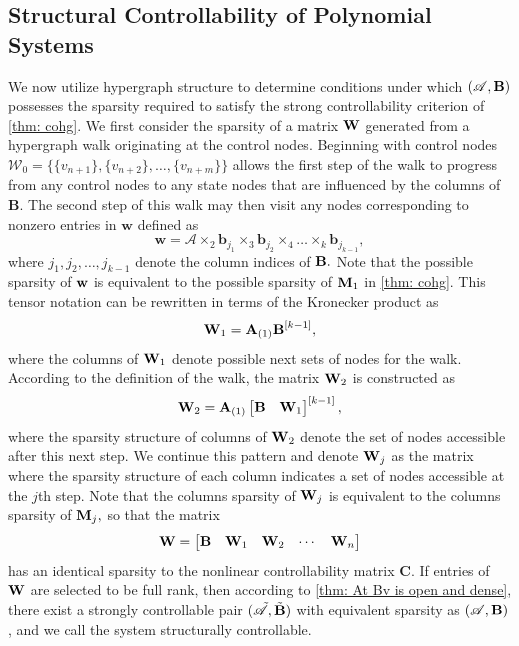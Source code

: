 \documentclass[journal,twoside,web]{ieeecolor}
\newcommand{\Ws}{\mathcal{W}}
\begin{document}
\subsection{Structural Controllability of Polynomial Systems}\label{sec: 3c}
We now utilize hypergraph structure to determine conditions under which $(\mathscr A,\textbf B)$  possesses the sparsity required to satisfy the strong controllability criterion of \cref{thm: cohg}.
%
We first consider the sparsity of a matrix $\textbf W$ generated from a hypergraph walk originating at the control nodes.
%
Beginning with control nodes $\Ws_0=\{\{v_{n+1}\},\{v_{n+2}\},\dots,\{v_{n+m}\}\}$ allows the first step of the walk to progress from any control nodes to any state nodes that are influenced by the columns of $\textbf{B}.$ 
%
The second step of this walk may then visit any nodes corresponding to nonzero entries in $\textbf{w}$ defined as
\begin{equation*}
    \textbf{w}=\mathscr A\times_2\textbf{b}_{j_1}\times_3\textbf{b}_{j_2}\times_4\dots\times_{k}\textbf{b}_{j_{k-1}},
\end{equation*}
where $j_1,j_2,\dots,j_{k-1}$ denote the column indices of $\textbf B.$
%
Note that the possible sparsity of $\textbf w$  is equivalent to the possible sparsity of $\textbf M_1$ in \cref{thm: cohg}.
%
This tensor notation can be rewritten in terms of the Kronecker product as
\begin{equation*}
    \textbf W_1=\textbf A_{(1)}\textbf B^{[k-1]},
\end{equation*}
where the columns of $\textbf W_1$ denote possible next sets of nodes for the walk.
%
According to the definition of the walk, the matrix $\textbf W_2$ is constructed as
\begin{equation*}
    \textbf W_2=\textbf A_{(1)}\begin{bmatrix}
        \textbf B&\textbf W_1
    \end{bmatrix}^{[k-1]},
\end{equation*}
 where the sparsity structure of columns of $\textbf W_2$ denote the set of nodes accessible after this next step.
%
We continue this pattern and denote  $\textbf W_j$ as the matrix where the sparsity structure of each column indicates a set of nodes accessible at the $j$th step.
%
Note that the columns sparsity of $\textbf W_j$ is equivalent to the columns sparsity of $\textbf M_j,$ so that the matrix
\begin{equation*}
    \textbf W=\begin{bmatrix}
    \textbf B&\textbf W_1&\textbf W_2&\cdots&\textbf W_{n}
\end{bmatrix}
\end{equation*}
has an identical sparsity to the nonlinear controllability matrix \textbf{C}.
%
If entries of $\textbf W$ are selected to be full rank, then according to \cref{thm: At Bv is open and dense}, there exist a strongly controllable pair $(\tilde{\mathscr A},\tilde{\textbf B})$ with equivalent sparsity as $(\mathscr A,\textbf B)$, and we call the system structurally controllable. 
\end{document}
